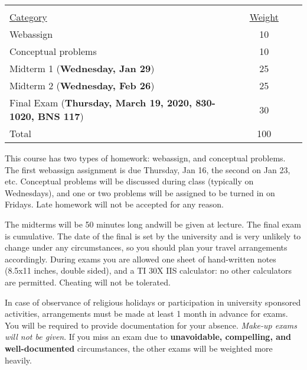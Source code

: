 \documentclass[11 pt]{report}
\begin{document}
\begin{center}\begin{tabular}{lccl} &  \\
\underline{Category} & \underline{Weight}  \\
Webassign 					 & 10 \\
Conceptual problems			& 10 \\
Midterm 1  ({\bf Wednesday, Jan 29})                   & 25  \\
Midterm 2  ({\bf Wednesday, Feb 26})                   & 25   \\
Final Exam ({\bf Thursday, March 19, 2020, 830-1020, BNS 117})                        & 30  \\
\hline Total                                        & 100
\end{tabular}
\end{center}

\vspace{0.25cm}



  This course has two types of homework: webassign, and conceptual problems. The first webassign assignment is due Thursday, Jan 16, the second on Jan 23, etc. Conceptual problems will be discussed during class (typically on Wednesdays), and one or two problems will be assigned to be turned in on Fridays. Late homework will not be accepted for any reason. 
\vspace{0.25cm}


  The midterms will be 50 minutes long andwill be given at lecture.  The final exam is cumulative. The date of the final is set by the university and is very unlikely to change under any circumstances, so you should plan your travel arrangements accordingly. During exams you are allowed one sheet of hand-written notes (8.5x11 inches, double sided), and a TI 30X IIS calculator: no other calculators are permitted. Cheating will not be tolerated. 

\vspace{.25cm}

  In case of observance of religious holidays or
participation in university sponsored activities, arrangements must
be made at least 1 month in advance for exams. You will be required
to provide documentation for your absence. \emph{Make-up exams will
not be given}.  If you miss an exam due to {\bf unavoidable,
compelling, and well-documented} circumstances, the other exams will
be weighted more heavily. \vspace{0.25cm}
\end{document}
